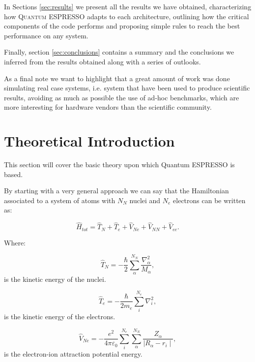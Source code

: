 \documentclass[a4paper,12pt]{article}
\newcommand\QE{\textsc{Quantum} ESPRESSO }
\begin{document}
In Sections \ref{sec:results} we present all the results we have obtained, characterizing how \QE adapts to each architecture, outlining how the critical components of the code performs and proposing simple rules to reach the best performance on any system.

Finally, section \ref{sec:conclusions} contains a summary and the conclusions we inferred from the results obtained along with a series of outlooks.

As a final note we want to highlight that a great amount of work was done simulating real case systems, i.e. system that have been used to produce scientific results, avoiding as much as possible the use of ad-hoc benchmarks, which are more interesting for hardware vendors than the scientific community.

\newpage

\section{Theoretical Introduction}\label{sec:intro}

This section will cover the basic theory upon which Quantum ESPRESSO is based.

By starting with a very general approach we can say that the Hamiltonian associated to a system of atoms with $N_N$ nuclei and $N_e$ electrons can be written as:


\begin{equation}\label{eq:theHamiltonianLong}
\hat{H}_{tot} = \hat{T}_{N} + \hat{T}_{e} + \hat{V}_{Ne} + \hat{V}_{NN} + \hat{V}_{ee}.
\end{equation}

Where:

\begin{equation}
\hat{T}_{N} = - \frac{\hbar}{2} \sum_{\alpha}^{N_N} \frac{\nabla_{\alpha}^2}{M_{\alpha}},
\end{equation}
is the kinetic energy of the nuclei.

\begin{equation}
\hat{T}_{e} = - \frac{\hbar}{2m_{e}} \sum_{i}^{N_e} \nabla_{i}^2,
\end{equation}
is the kinetic energy of the electrons.

\begin{equation}
\hat{V}_{Ne} = -\frac{e^2}{4\pi\varepsilon_{0}} \sum_{i}^{N_e}\sum_{\alpha}^{N_N} \frac{Z_{\alpha}}{\mid R_{\alpha} - r_{i} \mid },
\end{equation}
is the electron-ion attraction potential energy.
\end{document}
